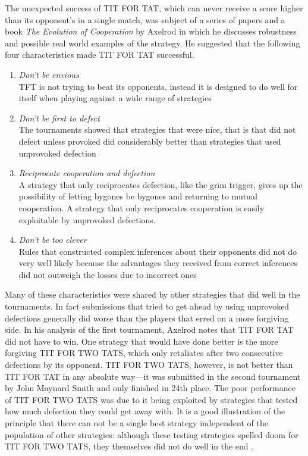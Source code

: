 The unexpected success of TIT FOR TAT, which can never receive a score higher than its opponent's in a single match, was subject of a series of papers and a book \textit{The Evolution of Cooperation} by Axelrod in which he discusses robustness and possible real world examples of the strategy. He suggested that the following four characteristics made TIT FOR TAT successful.
\begin{enumerate}
\item \textit{Don't be envious} \\
TFT is not trying to beat its opponents, instead it is designed to do well for itself when playing against a wide range of strategies
\item \textit{Don't be first to defect} \\
The tournaments showed that strategies that were nice, that is that did not defect unless provoked did considerably better than strategies that used unprovoked defection
\item \textit{Reciprocate cooperation and defection} \\
A strategy that only reciprocates defection, like the grim trigger, gives up the possibility of letting bygones be bygones and returning to mutual cooperation. A strategy that only reciprocates cooperation is easily exploitable by unprovoked defections.
\item \textit{Don't be too clever} \\
Rules that constructed complex inferences about their opponents did not do very well likely because the advantages they received from correct inferences did not outweigh the losses due to incorrect ones
\end{enumerate}

Many of these characteristics were shared by other strategies that did well in the tournaments. In fact submissions that tried to get ahead by using unprovoked defections generally did worse than the players that erred on a more forgiving side. In his analysis of the first tournament, Axelrod notes that TIT FOR TAT did not have to win. One strategy that would have done better is the more forgiving TIT FOR TWO TATS, which only retaliates after two consecutive defections by its opponent. TIT FOR TWO TATS, however, is not better than TIT FOR TAT in any absolute way---it was submitted in the second tournament by John Maynard Smith and only finished in 24th place. The poor performance of TIT FOR TWO TATS was due to it being exploited by strategies that tested how much defection they could get away with. It is a good illustration of the principle that there can not be a single best strategy independent of the population of other strategies: although these testing strategies spelled doom for TIT FOR TWO TATS, they themselves did not do well in the end \cite[p.47]{axelrod1984evolution}.

